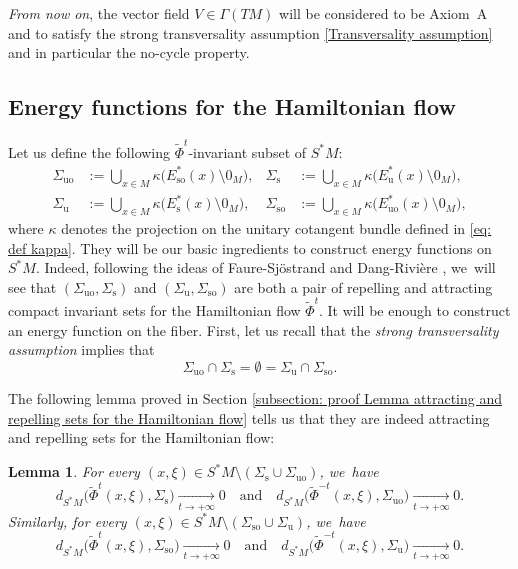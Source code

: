 \documentclass[JEP,XML,SOM,Unicode,NoEqCountersInSection,NoFloatCountersInSection,published]{cedram}
\newcommand{\rs}{\mathrm{s}}
\newcommand{\rso}{\mathrm{so}}
\newcommand{\ru}{\mathrm{u}}
\newcommand{\ruo}{\mathrm{uo}}
\theoremstyle{definition}
\theoremstyle{plain}
\newtheorem{lemma}[definition]{Lemma}
\begin{document}
\emph{From now on}, the vector field $V \in \Gamma (TM)$ will be considered to be Axiom~A and to satisfy the strong transversality assumption \eqref{Transversality assumption} and in particular the no-cycle property.

\subsection{Energy functions for the Hamiltonian flow}\label{subsection: energy function for the hamiltonian flow}

Let us define the following $\widetilde{\Phi}^t$-invariant subset of $S^*M$:
\begin{align*}
\Sigma_{\ruo} &:= \bigcup_{x \in M} \kappa \bigl(E_{\rso}^* (x) \setminus 0_M \bigr),& \Sigma_{\rs}&:= \bigcup_{x \in M} \kappa \bigl(E_\ru^* (x) \setminus 0_M \bigr),\\
\Sigma_{\ru} &:= \bigcup_{x \in M} \kappa \bigl(E_\rs^* (x) \setminus 0_M \bigr),& \Sigma_{\rso}&:= \bigcup_{x \in M} \kappa \bigl(E_{\ruo}^* (x) \setminus 0_M \bigr),
\end{align*}
where $\kappa$ denotes the projection on the unitary cotangent bundle defined in \eqref{eq: def kappa}.
They will be our basic ingredients to construct energy functions on $S^*M$. Indeed, following the ideas of Faure-Sjöstrand \cite{FS} and Dang-Rivière \cite{DR0, DRI}, we~will see that $(\Sigma_{\ruo},\Sigma_{\rs})$ and $(\Sigma_{\ru},\Sigma_{\rso})$ are both a pair of repelling and attracting compact invariant sets for the Hamiltonian flow $\widetilde{\Phi}^t$. It will be enough to construct an energy function on the fiber. First, let us recall that the \textit{strong transversality assumption} implies that
\[
\Sigma_{\ruo} \cap \Sigma_{\rs} = \emptyset = \Sigma_{\ru} \cap \Sigma_{\rso}.
\]

The following lemma proved in Section \ref{subsection: proof Lemma attracting and repelling sets for the Hamiltonian flow} tells us that they are indeed attracting and repelling sets for the Hamiltonian flow:

\begin{lemma}\label{lemma attractor and repeller on the phase space}
For every $(x,\xi) \in S^* M \setminus(\Sigma_{\rs} \cup \Sigma_{\ruo})$, we~have
\[
d_{S^* M} \bigl(\widetilde{\Phi}^{t} (x,\xi), \Sigma_{\rs} \bigr) \underset{t \to +\infty}{\to } 0 \quad\text{and}\quad
d_{S^* M} \bigl(\widetilde{\Phi}^{-t} (x,\xi), \Sigma_{\ruo} \bigr) \underset{t \to +\infty}{\to } 0.
\]
Similarly, for every $(x,\xi) \in S^* M \setminus \left(\Sigma_{\rso} \cup \Sigma_{\ru} \right)$, we~have
\[
d_{S^* M} \bigl(\widetilde{\Phi}^{t} (x,\xi), \Sigma_{\rso} \bigr) \underset{t \to +\infty}{\to } 0 \quad\text{and}\quad
d_{S^* M} \bigl(\widetilde{\Phi}^{-t} (x,\xi), \Sigma_{\ru} \bigr) \underset{t \to +\infty}{\to } 0.
\]
\end{lemma}
\end{document}
